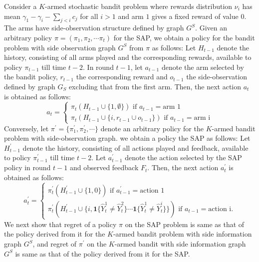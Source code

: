 \documentclass{article}
\begin{document}
Consider a $K$-armed stochastic bandit problem where rewards distribution $\nu_i$ has mean  $\gamma_1-\gamma_i- \sum_{j< i}c_j$ for all $i >1$ and arm $1$ gives a fixed reward of value $0$. The arms have side-observation structure defined by graph $G^S$.  
Given an arbitrary policy $\pi=(\pi_1, \pi_2, \cdots \pi_t )$ for the SAP, we obtain a policy for the bandit problem with side observation graph $G^S$ from $\pi$ as follows: Let $H_{t-1}$ denote the history, consisting of all arms played and the corresponding rewards, available to policy $\pi_{t-1}$ till time $t-2$. In round $t-1$, let $a_{t-1}$ denote the arm selected by the bandit policy,  $r_{t-1}$ the corresponding reward and $o_{t-1}$ the side-observation defined by graph $G_S$ excluding that from the first arm. Then, the next action $a_t$ is obtained as follows:
\begin{equation}
\label{eqn:SAPtoKBandit}
a_t=
\begin{cases}
\pi_t(H_{t-1}\cup \{1, \emptyset
\}) \mbox{ if } a_{t-1}= \mbox{arm 1}	\\
\pi_t(H_{t-1} \cup \{i, r_{t-1}\cup o_{t-1}\}) \mbox{ if } a_{t-1}= \mbox{arm i}
\end{cases}
\end{equation}
\noindent
Conversely, let $\pi^\prime=\{\pi^\prime_1, \pi^\prime_2,\cdots\}$ denote an arbitrary policy for the $K$-armed bandit problem with side-observation graph. we obtain a policy the SAP as follows: Let $H^\prime_{t-1}$ denote the history, consisting of all actions played and feedback, available to policy $\pi^\prime_{t-1}$ till time $t-2$. Let $a^\prime_{t-1}$ denote the action selected by the SAP policy in round $t-1$ and observed feedback $F_t$. Then, the next action $a^\prime_t$ is obtained as follows:
\begin{equation}
\label{eqn:KBanditToSAP}
a^\prime_t=
\begin{cases}
\pi^\prime_t(H^\prime_{t-1} \cup \{1, 0
\}) \mbox{ if } a^\prime_{t-1}= \mbox{action 1}	\\
\pi^\prime_t(H^\prime_{t-1} \cup \{i, \boldsymbol{1}\{\hat{Y}_t^1\neq \hat{Y}_t^2\}\cdots \boldsymbol{1}\{\hat{Y}_t^1\neq \hat{Y}_t^i\}\}) \mbox{ if } a_{t-1}= \mbox{action i}.
\end{cases}
\end{equation}
We next show that regret of a policy $\pi$ on the SAP problem is same as that of the policy derived from it for the $K$-armed bandit problem with side information graph $G^S$, 
and regret of $\pi^\prime$ on the $K$-armed bandit with side information graph  $G^S$ is same as that of the policy derived from it for the SAP.
\end{document}
